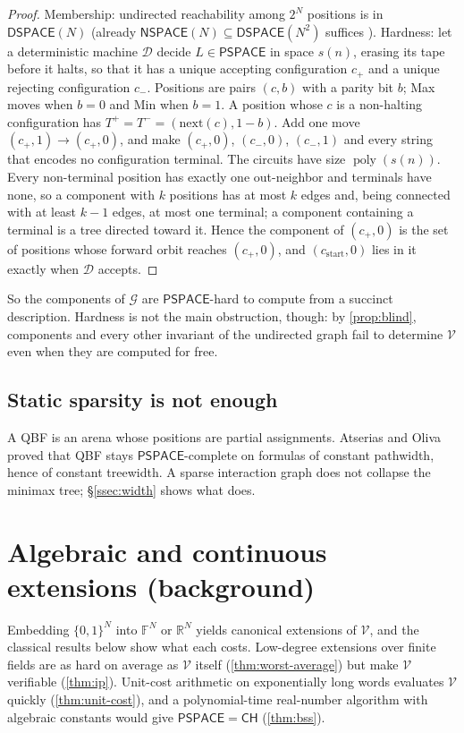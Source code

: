 \documentclass[11pt]{amsart}
\theoremstyle{plain}
\theoremstyle{definition}
\theoremstyle{remark}
\numberwithin{equation}{section}
\newcommand{\RR}{\mathbb{R}}
\newcommand{\FF}{\mathbb{F}}
\newcommand{\val}{\mathcal{V}}            %
\newcommand{\SG}{\mathcal{G}}             %
\newcommand{\poly}{\operatorname{poly}}
\newcommand{\cls}[1]{\mathsf{#1}}
\newcommand{\PSPACE}{\cls{PSPACE}}
\newcommand{\CH}{\cls{CH}}
\begin{document}
\begin{proof}
Membership: undirected reachability among $2^N$ positions is in $\mathsf{DSPACE}(N)$ \cite{Reingold} (already $\mathsf{NSPACE}(N)\subseteq\mathsf{DSPACE}(N^2)$ suffices \cite{Savitch}). Hardness: let a deterministic machine $\mathcal D$ decide $L\in\PSPACE$ in space $s(n)$, erasing its tape before it halts, so that it has a unique accepting configuration $c_{+}$ and a unique rejecting configuration $c_{-}$. Positions are pairs $(c,b)$ with a parity bit $b$; Max moves when $b=0$ and Min when $b=1$. A position whose $c$ is a non-halting configuration has $T^{+}=T^{-}=(\mathrm{next}(c),1-b)$. Add one move $(c_{+},1)\to(c_{+},0)$, and make $(c_{+},0)$, $(c_{-},0)$, $(c_{-},1)$ and every string that encodes no configuration terminal. The circuits have size $\poly(s(n))$. Every non-terminal position has exactly one out-neighbor and terminals have none, so a component with $k$ positions has at most $k$ edges and, being connected with at least $k-1$ edges, at most one terminal; a component containing a terminal is a tree directed toward it. Hence the component of $(c_{+},0)$ is the set of positions whose forward orbit reaches $(c_{+},0)$, and $(c_{\mathrm{start}},0)$ lies in it exactly when $\mathcal D$ accepts.
\end{proof}

So the components of $\SG$ are $\PSPACE$-hard to compute from a succinct description. Hardness is not the main obstruction, though: by \cref{prop:blind}, components and every other invariant of the undirected graph fail to determine $\val$ even when they are computed for free.

\subsection{Static sparsity is not enough}
A QBF is an arena whose positions are partial assignments. Atserias and Oliva \cite{AtseriasOliva} proved that QBF stays $\PSPACE$-complete on formulas of constant pathwidth, hence of constant treewidth. A sparse interaction graph does not collapse the minimax tree; \S\ref{ssec:width} shows what does.

\section{Algebraic and continuous extensions (background)}\label{sec:extensions}

Embedding $\{0,1\}^N$ into $\FF^N$ or $\RR^N$ yields canonical extensions of $\val$, and the classical results below show what each costs. Low-degree extensions over finite fields are as hard on average as $\val$ itself (\cref{thm:worst-average}) but make $\val$ verifiable (\cref{thm:ip}). Unit-cost arithmetic on exponentially long words evaluates $\val$ quickly (\cref{thm:unit-cost}), and a polynomial-time real-number algorithm with algebraic constants would give $\PSPACE=\CH$ (\cref{thm:bss}).
\end{document}
